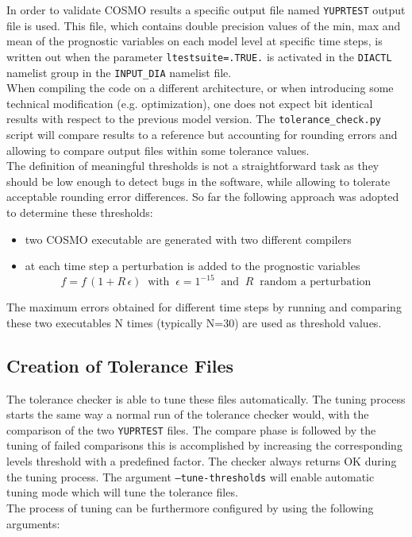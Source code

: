 \documentclass[12pt,twoside,a4paper]{report}
\begin{document}
In order to validate COSMO results a specific output file named \texttt{YUPRTEST} output file is used. This file, which contains double precision values of the min, max and mean of the prognostic variables on each model level at specific time steps, is written out when the parameter \texttt{ltestsuite=.TRUE.} is activated in the \texttt{DIACTL} namelist group in the \texttt{INPUT\_DIA} namelist file.\\
When compiling the code on a different architecture, or when introducing some technical modification (e.g. optimization), one does not expect bit identical results with respect to the previous model version. The \texttt{tolerance\_check.py} script will compare results to a reference but accounting for rounding errors and allowing to compare output files within some tolerance values.\\
The definition of meaningful thresholds is not a straightforward task as they should be low enough to detect bugs in the software, while allowing to tolerate acceptable rounding error differences. So far the following approach was adopted to determine these thresholds:
\begin{itemize}
	\item two COSMO executable are generated with two different compilers
	\item at each time step a perturbation is added to the prognostic variables
	\begin{equation}
	    f=f\,(1+R\,\epsilon) \; \; \mbox{with} \; \; \epsilon=1^{-15} \; \; \mbox{and} \; \; R  \; \; \mbox{random a perturbation}
	\end{equation} 
\end{itemize}

The maximum errors obtained for different time steps by running and comparing these two executables N times (typically N=30) are used as threshold values.\\

\subsection{Creation of Tolerance Files}

The tolerance checker is able to tune these files automatically. 
The tuning process starts the same way a normal run of the tolerance checker would, with the comparison of the two \texttt{YUPRTEST} files. The compare phase is followed by the tuning of failed comparisons this is accomplished by increasing the corresponding levels threshold with a predefined factor. The checker always returns {\color{green} OK} during the tuning process.
The argument \texttt{--tune-thresholds} will enable automatic tuning mode which will tune the tolerance files. \\ 
The process of tuning can be furthermore configured by using the following arguments:
\end{document}
